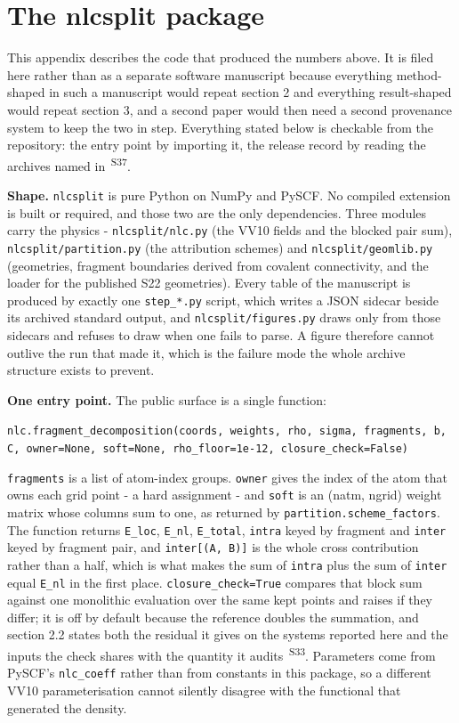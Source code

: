\documentclass[11pt]{article}
\newcommand{\prov}[1]{\textsuperscript{\,#1}}
\begin{document}
\section*{The nlcsplit package}

This appendix describes the code that produced the numbers above. It is filed here rather than as a separate software manuscript because everything method-shaped in such a manuscript would repeat section 2 and everything result-shaped would repeat section 3, and a second paper would then need a second provenance system to keep the two in step. Everything stated below is checkable from the repository: the entry point by importing it, the release record by reading the archives named in \prov{S37}.

\textbf{Shape.} \texttt{nlcsplit} is pure Python on NumPy and PySCF. No compiled extension is built or required, and those two are the only dependencies. Three modules carry the physics - \texttt{nlcsplit/nlc.py} (the VV10 fields and the blocked pair sum), \texttt{nlcsplit/partition.py} (the attribution schemes) and \texttt{nlcsplit/geomlib.py} (geometries, fragment boundaries derived from covalent connectivity, and the loader for the published S22 geometries). Every table of the manuscript is produced by exactly one \texttt{step\_*.py} script, which writes a JSON sidecar beside its archived standard output, and \texttt{nlcsplit/figures.py} draws only from those sidecars and refuses to draw when one fails to parse. A figure therefore cannot outlive the run that made it, which is the failure mode the whole archive structure exists to prevent.

\textbf{One entry point.} The public surface is a single function:

\texttt{nlc.fragment\_\allowbreak{}decomposition(coords, weights, rho, sigma, fragments, b, C, owner=None, soft=None, rho\_\allowbreak{}floor=1e-12, closure\_\allowbreak{}check=False)}

\texttt{fragments} is a list of atom-index groups. \texttt{owner} gives the index of the atom that owns each grid point - a hard assignment - and \texttt{soft} is an (natm, ngrid) weight matrix whose columns sum to one, as returned by \texttt{partition.scheme\_factors}. The function returns \texttt{E\_loc}, \texttt{E\_nl}, \texttt{E\_total}, \texttt{intra} keyed by fragment and \texttt{inter} keyed by fragment pair, and \texttt{inter[(A, B)]} is the whole cross contribution rather than a half, which is what makes the sum of \texttt{intra} plus the sum of \texttt{inter} equal \texttt{E\_nl} in the first place. \texttt{closure\_check=True} compares that block sum against one monolithic evaluation over the same kept points and raises if they differ; it is off by default because the reference doubles the summation, and section 2.2 states both the residual it gives on the systems reported here and the inputs the check shares with the quantity it audits \prov{S33}. Parameters come from PySCF's \texttt{nlc\_coeff} rather than from constants in this package, so a different VV10 parameterisation cannot silently disagree with the functional that generated the density.
\end{document}
